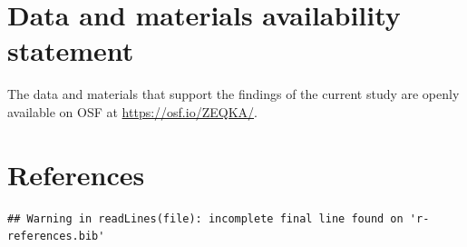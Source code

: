 \documentclass[
  english,
  man,floatsintext]{apa6}
\begin{document}
\newpage

\hypertarget{data-and-materials-availability-statement}{%
\section{Data and materials availability statement}\label{data-and-materials-availability-statement}}

The data and materials that support the findings of the current study are openly available on OSF at \url{https://osf.io/ZEQKA/}.

\newpage

\hypertarget{references}{%
\section{References}\label{references}}

\begin{verbatim}
## Warning in readLines(file): incomplete final line found on 'r-references.bib'
\end{verbatim}

\begingroup
\setlength{\parindent}{-0.5in}
\setlength{\leftskip}{0.5in}
\end{document}
